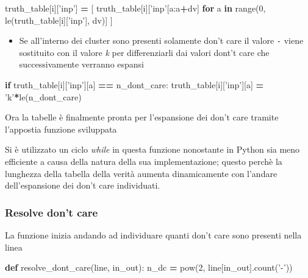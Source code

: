 \documentclass[]{book}
\newenvironment{Shaded}{\begin{snugshade}}{\end{snugshade}}
\newcommand{\BuiltInTok}[1]{#1}
\newcommand{\ControlFlowTok}[1]{\textcolor[rgb]{0.13,0.29,0.53}{\textbf{#1}}}
\newcommand{\DecValTok}[1]{\textcolor[rgb]{0.00,0.00,0.81}{#1}}
\newcommand{\KeywordTok}[1]{\textcolor[rgb]{0.13,0.29,0.53}{\textbf{#1}}}
\newcommand{\NormalTok}[1]{#1}
\newcommand{\OperatorTok}[1]{\textcolor[rgb]{0.81,0.36,0.00}{\textbf{#1}}}
\newcommand{\StringTok}[1]{\textcolor[rgb]{0.31,0.60,0.02}{#1}}
\providecommand{\tightlist}{%
  \setlength{\itemsep}{0pt}\setlength{\parskip}{0pt}}
\begin{document}
\begin{Shaded}
\begin{Highlighting}[]
\NormalTok{truth_table[i][}\StringTok{'inp'}\NormalTok{] }\OperatorTok{=}\NormalTok{ [}
\NormalTok{   truth_table[i][}\StringTok{'inp'}\NormalTok{[a:a}\OperatorTok{+}\NormalTok{dv]}
   \ControlFlowTok{for}\NormalTok{ a }\KeywordTok{in} \BuiltInTok{range}\NormalTok{(}\DecValTok{0}\NormalTok{, le(truth_table[i][}\StringTok{'inp'}\NormalTok{], dv)]}
\NormalTok{ ]}
\end{Highlighting}
\end{Shaded}

\begin{itemize}
\tightlist
\item
  Se all'interno dei cluster sono presenti solamente don't care il valore \texttt{-} viene sostituito con il valore \emph{k} per differenziarli dai valori dont't care che successivamente verranno espansi
\end{itemize}

\begin{Shaded}
\begin{Highlighting}[]
\ControlFlowTok{if}\NormalTok{ truth_table[i][}\StringTok{'inp'}\NormalTok{][a] }\OperatorTok{==}\NormalTok{ n_dont_care:}
\NormalTok{  truth_table[i][}\StringTok{'inp'}\NormalTok{][a] }\OperatorTok{=} \StringTok{'k'}\OperatorTok{*}\NormalTok{le(n_dont_care)}
\end{Highlighting}
\end{Shaded}

Ora la tabelle è finalmente pronta per l'espansione dei don't care tramite l'appostia funzione sviluppata

Si è utilizzato un ciclo \emph{while} in questa funzione nonostante in Python sia meno efficiente a causa della natura della sua implementazione; questo perchè la lunghezza della tabella della verità aumenta dinamicamente con l'andare dell'espansione dei don't care individuati.

\hypertarget{resolve-dont-care}{%
\subsubsection{Resolve don't care}\label{resolve-dont-care}}

La funzione inizia andando ad individuare quanti don't care sono presenti nella linea

\begin{Shaded}
\begin{Highlighting}[]
\KeywordTok{def}\NormalTok{ resolve_dont_care(line, in_out):}
\NormalTok{  n_dc }\OperatorTok{=} \BuiltInTok{pow}\NormalTok{(}\DecValTok{2}\NormalTok{, line[in_out].count(}\StringTok{'-'}\NormalTok{))}
\end{Highlighting}
\end{Shaded}
\end{document}
